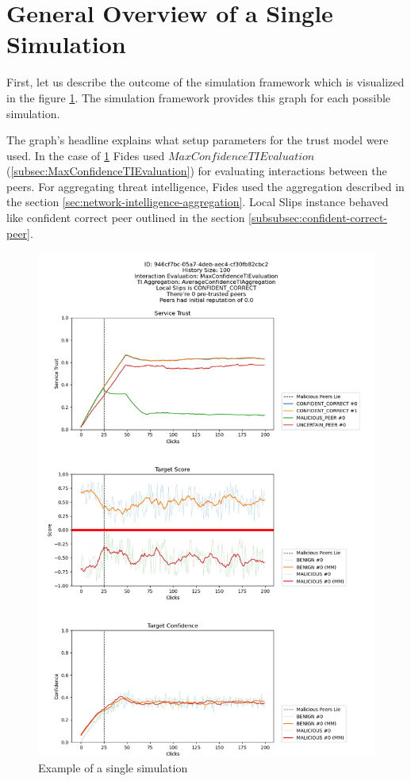\section{General Overview of a Single Simulation}
\label{sec:general-overview-of-simulation-output}
First, let us describe the outcome of the simulation framework which is visualized in the figure \ref{fig:single-simulation-example}.
The simulation framework provides this graph for each possible simulation.

The graph's headline explains what setup parameters for the trust model were used. In the case of \ref{fig:single-simulation-example} Fides used $MaxConfidenceTIEvaluation$ (\ref{subsec:MaxConfidenceTIEvaluation}) for evaluating interactions between the peers.
For aggregating threat intelligence, Fides used the aggregation described in the section \ref{sec:network-intelligence-aggregation}.
Local Slips instance behaved like confident correct peer outlined in the section  \ref{subsubsec:confident-correct-peer}.

\begin{figure}
    \centering
    \includegraphics[width=1.0\textwidth]{assets/example_evaluation.png}
    \caption{Example of a single simulation}
    \label{fig:single-simulation-example}
\end{figure}

